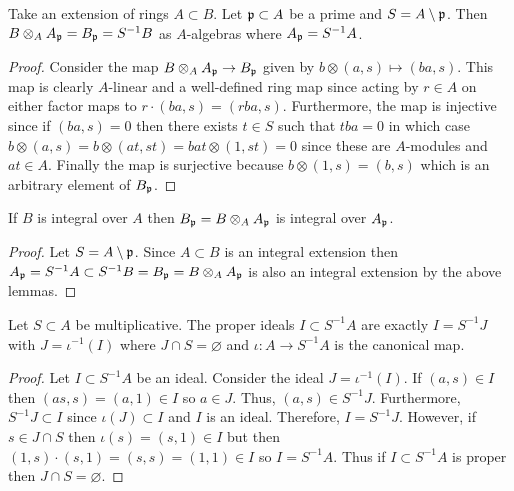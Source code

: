 \documentclass[12pt]{extarticle}
\begin{document}
\begin{lemma}
Take an extension of rings $A \subset B$. Let $\mathfrak{p} \subset A$ be a prime and $S = A \setminus \mathfrak{p}$. Then $B \otimes_A A_{\mathfrak{p}} = B_{\mathfrak{p}} = S^{-1}B$ as $A$-algebras where $A_{\mathfrak{p}} = S^{-1} A$. 
\end{lemma}

\begin{proof}
Consider the map $B \otimes_A A_{\mathfrak{p}} \to B_{\mathfrak{p}}$ given by $b \otimes (a, s) \mapsto (ba, s)$. This map is clearly $A$-linear and a well-defined ring map since acting by $r \in A$ on either factor maps to $r \cdot (ba, s) = (rba, s)$. Furthermore, the map is injective since if $(ba, s) = 0$ then there exists $t \in S$ such that $tba = 0$ in which case $b \otimes (a, s) = b \otimes (at, st) = bat \otimes (1, st) = 0$ since these are $A$-modules and $at \in A$. Finally the map is surjective because $b \otimes (1, s) = (b, s)$ which is an arbitrary element of $B_{\mathfrak{p}}$. 
\end{proof}

\begin{corollary} \label{integral_extensions_localizations}
If $B$ is integral over $A$ then $B_{\mathfrak{p}} = B \otimes_A A_{\mathfrak{p}}$ is integral over $A_{\mathfrak{p}}$. 
\end{corollary}

\begin{proof}
Let $S = A \setminus \mathfrak{p}$. Since $A \subset B$ is an integral extension then $A_{\mathfrak{p}} = S^{-1} A \subset S^{-1} B = B_{\mathfrak{p}} = B \otimes_A A_{\mathfrak{p}}$ is also an integral extension by the above lemmas.
\end{proof}

\begin{lemma} \label{ideals_of_localization}
Let $S \subset A$ be multiplicative. The proper ideals $I \subset S^{-1} A$ are exactly $I = S^{-1} J$ with $J = \iota^{-1}(I)$ where $J \cap S = \varnothing$ and $\iota : A \to S^{-1} A$ is the canonical map. 
\end{lemma}

\begin{proof}
Let $I \subset S^{-1} A$ be an ideal. Consider the ideal $J = \iota^{-1}(I)$. If $(a, s) \in I$ then $(as, s) = (a, 1) \in I$ so $a \in J$. Thus, $(a, s) \in S^{-1} J$. Furthermore, $S^{-1} J \subset I$ since $\iota(J) \subset I$ and $I$ is an ideal. Therefore, $I = S^{-1} J$. However, if $s \in J \cap S$ then $\iota(s) = (s, 1) \in I$ but then $(1, s) \cdot (s, 1) = (s, s) = (1, 1) \in I$ so $I = S^{-1} A$. Thus if $I \subset S^{-1} A$ is proper then $J \cap S = \varnothing$. 
\end{proof}
\end{document}
